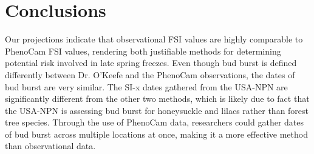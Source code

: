 \documentclass{article}
\begin{document}

\section*{Conclusions}
Our projections indicate that observational FSI values are highly comparable to PhenoCam FSI values, rendering both justifiable methods for determining potential risk involved in late spring freezes. Even though bud burst is defined differently between Dr. O'Keefe and the PhenoCam observations, the dates of bud burst are very similar. The SI-x dates gathered from the USA-NPN are significantly different from the other two methods, which is likely due to fact that the USA-NPN is assessing bud burst for honeysuckle and lilacs rather than forest tree species. Through the use of PhenoCam data, researchers could gather dates of bud burst across multiple locations at once, making it a more effective method than observational data. 

\newpage
\printbibliography
\end{document}
